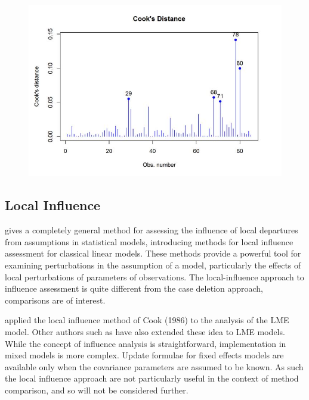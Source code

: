 \documentclass[12pt, a4paper]{report}
\theoremstyle{definition}
\theoremstyle{remark}
\begin{document}
	
	\begin{figure}[h!]
		\centering
		\includegraphics[width=0.9\linewidth]{images/CooksDistancePlot-JS-Roy}
		\caption{}
		\label{fig:CooksDistancePlot-JS-Roy}
	\end{figure}	
	

	
\subsection{Local Influence}
\citet{cook86} gives a completely general method for assessing the influence of local departures from assumptions in statistical models, introducing methods for local influence assessment for classical linear models. These methods provide a powerful tool for examining perturbations in the assumption of a model, particularly the effects of local perturbations of parameters of observations. The local-influence approach to influence assessment is quite different from the case deletion approach, comparisons are of interest.

\citet{Beckman} applied the local influence method of Cook (1986) to the analysis of the LME model.  Other authors such as \citet{lesaffre1998local} have also extended these idea to LME models. 
While the concept of influence analysis is straightforward, implementation in mixed models is more complex. Update formulae for fixed effects models are available only when the covariance parameters are assumed to be known. As such the local influence approach are not particularly useful in the context of method comparison, and so will not be considered further.
\end{document}
